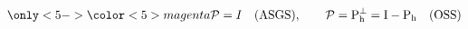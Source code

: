 \begin{frame}[t]
\begin{overlayarea}{\textwidth}{3.0cm}
{\begin{equation*}
\only<5->{{\color<5>{magenta} \mathcal{P} = I \quad \rm{(ASGS)}, \quad \quad  \mathcal{P} = P_h^{\perp}=I-P_h \quad \rm{(OSS)} }}
\end{equation*}
}
\end{overlayarea}
%
\end{frame}
